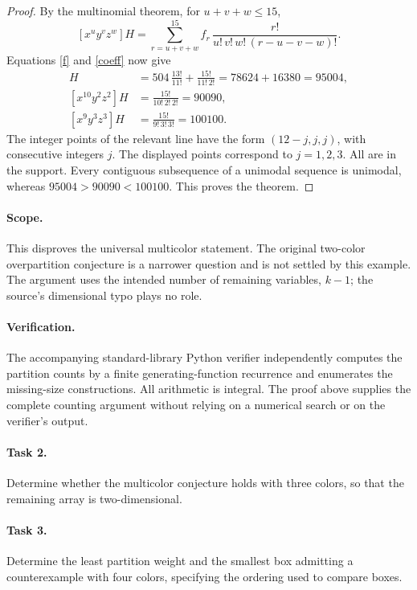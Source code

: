 \documentclass[10pt]{article}
\newcommand{\coeff}[1]{[#1]}
\begin{document}
\begin{proof}
By the multinomial theorem, for \(u+v+w\leq15\),
\begin{equation}\label{coeff}
 \coeff{x^uy^vz^w}H
 =\sum_{r=u+v+w}^{15}
   f_r\,\frac{r!}{u!\,v!\,w!\,(r-u-v-w)!}.
\end{equation}
Equations \eqref{f} and \eqref{coeff} now give
\begin{align*}
 \coeff{x^{11}yz}H
   &=504\,\frac{13!}{11!}
     +\frac{15!}{11!\,2!}
     =78624+16380=95004,\\
 \coeff{x^{10}y^2z^2}H
   &=\frac{15!}{10!\,2!\,2!}=90090,\\
 \coeff{x^9y^3z^3}H
   &=\frac{15!}{9!\,3!\,3!}=100100.
\end{align*}
The integer points of the relevant line have the form
\((12-j,j,j)\), with consecutive integers \(j\). The displayed points
correspond to \(j=1,2,3\). All are in the support.
Every contiguous subsequence of a unimodal sequence is unimodal, whereas
\(95004>90090<100100\). This proves the theorem.
\end{proof}

\paragraph{Scope.}
This disproves the universal multicolor statement. The original
two-color overpartition conjecture is a narrower question and is not
settled by this example. The argument uses the intended number of
remaining variables, \(k-1\); the source's dimensional typo plays
no role.

\paragraph{Verification.}
The accompanying standard-library Python verifier independently computes
the partition counts by a finite generating-function recurrence and
enumerates the missing-size constructions. All arithmetic is integral.
The proof above supplies the complete counting argument without relying
on a numerical search or on the verifier's output.

\paragraph{Task 2.}
Determine whether the multicolor conjecture holds with three colors,
so that the remaining array is two-dimensional.

\paragraph{Task 3.}
Determine the least partition weight and the smallest box admitting a
counterexample with four colors, specifying the ordering used to compare
boxes.
\end{document}
